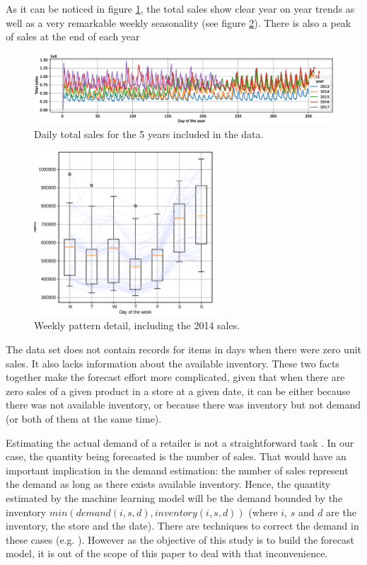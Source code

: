 \documentclass{elsarticle}
\begin{document}
	 As it can be noticed in figure \ref{fig:timeseries}, the total sales show clear year on year trends as well as a very remarkable weekly seasonality (see figure \ref{fig:timeseries_detail}). There is also a peak of sales at the end of each year
	 
	 	\begin{figure}
	 	\centering
	 	\includegraphics[width=1\textwidth]{img/timeseries}
	 	\caption{Daily total sales for the 5 years included in the data.}
	 	\label{fig:timeseries}
	 \end{figure}
	
	\begin{figure}
		\centering
		\includegraphics[width=0.6\textwidth]{img/timeseries_dow}
		\caption{Weekly pattern detail, including the 2014 sales.}
		\label{fig:timeseries_detail}
	\end{figure}

	The data set does not contain records for items in days when there were zero unit sales. It also lacks information about the available inventory. These two facts together make the forecast effort more complicated, given that when there are zero sales of a given product in a store at a given date, it can be either because there was not available inventory, or because there was inventory but not demand (or both of them at the same time).
	
	Estimating the actual demand of a retailer is not a straightforward task \cite{Deep2019}. In our case, the quantity being forecasted is the number of sales. That would have an important implication in the demand estimation: the number of sales represent the demand as long as there exists available inventory. Hence, the quantity estimated by the machine learning model will be the demand bounded by the inventory $min(demand(i,s,d), inventory(i,s,d))$ (where $i$, $s$ and $d$ are the inventory, the store and the date). There are techniques to correct the demand in these cases (e.g. \cite{Bell2000}). However as the objective of this study is to build the forecast model, it is out of the scope of this paper to deal with that inconvenience.
	
\end{document}
